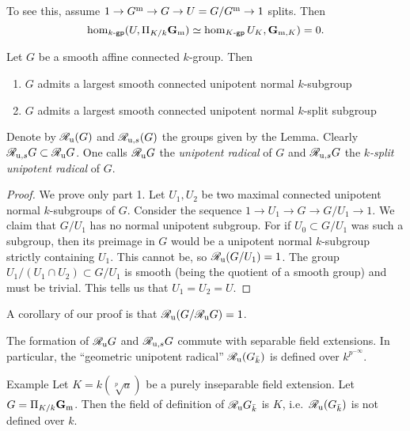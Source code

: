 To see this, assume $1 \to G^{\mathrm{m}} \to G \to U=G/G^{\mathrm{m}}\to 1$ splits. Then 
\[
  \hom_{k\textnormal{-}\mathsf{gp}}(U,\Pi_{K/k} \mathbf{G}_{\mathrm{m}}) \simeq \hom_{K\textnormal{-}\mathsf{gp}} U_K, \mathbf{G}_{\mathrm{m},K}) = 0. 
\]

\begin{lemm}
Let $G$ be a smooth affine connected $k$-group. Then 
\begin{enumerate}
  \item $G$ admits a largest smooth connected unipotent normal $k$-subgroup 
  \item $G$ admits a largest smooth connected unipotent normal $k$-split 
    subgroup 
\end{enumerate}
\end{lemm}

Denote by $\mathscr{R}_{\mathrm{u}} (G)$ and $\mathscr{R}_{\mathrm{u}, s}(G)$ the groups given by the Lemma. Clearly 
$\mathscr{R}_{\mathrm{u},s} G\subset \mathscr{R}_{\mathrm{u}}  G$. One calls $\mathscr{R}_{\mathrm{u}}  G$ the \emph{unipotent radical} of 
$G$ and $\mathscr{R}_{\mathrm{u},s} G$ the \emph{$k$-split unipotent radical} of $G$. 

\begin{proof}
We prove only part 1. Let $U_1,U_2$ be two maximal connected unipotent normal $k$-subgroups of 
$G$. Consider the sequence $1 \to U_1 \to G \to G/U_1\to 1$. We claim that 
$G/U_1$ has no normal unipotent subgroup. For if 
$U_0\subset G/U_1$ was such a subgroup, then its preimage in 
$G$ would be a unipotent normal $k$-subgroup strictly containing $U_1$. 
This cannot be, so $\mathscr{R}_{\mathrm{u}}  (G/U_1) = 1$. The group $U_1/(U_1\cap U_2)\subset G/U_1$ 
is smooth (being the quotient of a smooth group) and must be trivial. This tells 
us that $U_1=U_2=U$. 
\end{proof}

A corollary of our proof is that $\mathscr{R}_{\mathrm{u}} (G/\mathscr{R}_{\mathrm{u}}  G)=1$. 

\begin{lemm}
The formation of $\mathscr{R}_{\mathrm{u}}  G$ and $\mathscr{R}_{\mathrm{u}, s} G$ commute with separable field extensions. 
In particular, the ``geometric unipotent radical'' $\mathscr{R}_{\mathrm{u}} (G_{\bar k})$ is defined 
over $k^{p^{-\infty}}$. 
\end{lemm}

\begin{enonce}[remark]{Example}\label{eg:pseudo-red}
Let $K=k(\sqrt[p] a)$ be a purely inseparable field extension. Let 
$G=\Pi_{K/k} \mathbf{G}_{\mathrm{m}}$. Then the field of definition of 
$\mathscr{R}_{\mathrm{u}}  G_{\bar k}$ is $K$, i.e.\ $\mathscr{R}_{\mathrm{u}}  (G_{\bar k})$ is not defined over $k$. 
\end{enonce}

